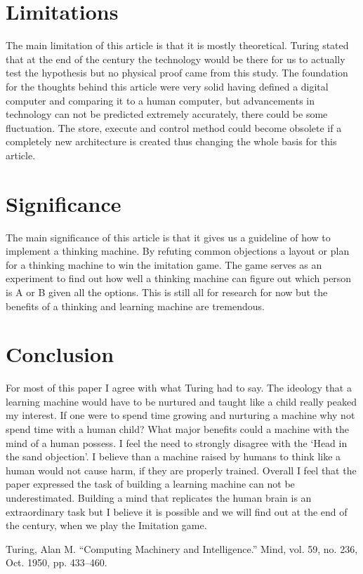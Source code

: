 \documentclass[journal, a4paper]{IEEEtran}
\begin{document}
\section{Limitations}

The main limitation of this article is that it is mostly theoretical. Turing stated that at the end of the century the technology would be there for us to actually test the hypothesis but no physical proof came from this study. The foundation for the thoughts behind this article were very solid having defined a digital computer and comparing it to a human computer, but advancements in technology can not be predicted extremely accurately, there could be some fluctuation. The store, execute and control method could become obsolete if a completely new architecture is created thus changing the whole basis for this article. 

\section{Significance}
The main significance of this article is that it gives us a guideline of how to implement a thinking machine. By refuting common objections a layout or plan for a thinking machine to win the imitation game. The game serves as an experiment to find out how well a thinking machine can figure out which person is A or B given all the options. This is still all for research for now but the benefits of a thinking and learning machine are tremendous. 

\section{Conclusion}
	For most of this paper I agree with what Turing had to say. The ideology that a learning machine would have to be nurtured and taught like a child really peaked my interest. If one were to spend time growing and nurturing a machine why not spend time with a human child? What major benefits could a machine with the mind of a human possess. I feel the need to strongly disagree with the `Head in the sand objection'. I believe than a machine raised by humans to think like a human would not cause harm, if they are properly trained. Overall I feel that the paper expressed the task of building a learning machine can not be underestimated. Building a mind that replicates the human brain is an extraordinary task but I believe it is possible and we will find out at the end of the century, when we play the Imitation game.

\begin{thebibliography}{5}

	Turing, Alan M. “Computing Machinery and Intelligence.” Mind, vol. 59, no. 236, Oct. 1950, pp. 433–460.

\end{thebibliography}

\newpage

\end{document}

